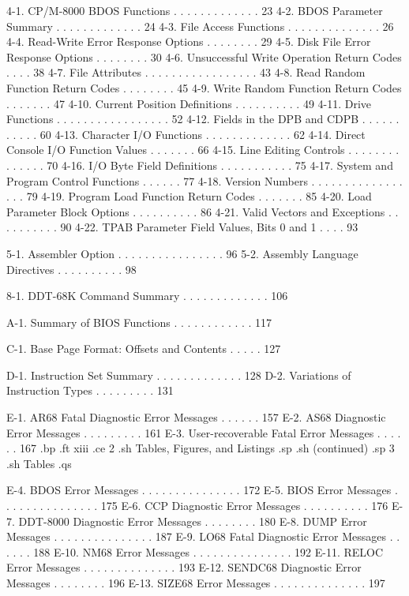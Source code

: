      4-1.  CP/M-8000 BDOS Functions . . . . . . . . . . . . .   23
     4-2.  BDOS Parameter Summary  . . . . . . . . . . . . .   24
     4-3.  File Access Functions . . . . . . . . . . . . . .   26
     4-4.  Read-Write Error Response Options . . . . . . . .   29
     4-5.  Disk File Error Response Options  . . . . . . . .   30
     4-6.  Unsuccessful Write Operation Return Codes . . . .   38
     4-7.  File Attributes . . . . . . . . . . . . . . . . .   43
     4-8.  Read Random Function Return Codes . . . . . . . .   45
     4-9.  Write Random Function Return Codes  . . . . . . .   47
     4-10. Current Position Definitions  . . . . . . . . . .   49
     4-11. Drive Functions . . . . . . . . . . . . . . . . .   52
     4-12. Fields in the DPB and CDPB  . . . . . . . . . . .   60
     4-13. Character I/O Functions . . . . . . . . . . . . .   62
     4-14. Direct Console I/O Function Values  . . . . . . .   66
     4-15. Line Editing Controls . . . . . . . . . . . . . .   70
     4-16. I/O Byte Field Definitions  . . . . . . . . . . .   75
     4-17. System and Program Control Functions  . . . . . .   77
     4-18. Version Numbers . . . . . . . . . . . . . . . . .   79
     4-19. Program Load Function Return Codes  . . . . . . .   85
     4-20. Load Parameter Block Options  . . . . . . . . . .   86
     4-21. Valid Vectors and Exceptions  . . . . . . . . . .   90
     4-22. TPAB Parameter Field Values, Bits 0 and 1 . . . .   93

     5-1.  Assembler Option  . . . . . . . . . . . . . . . .   96
     5-2.  Assembly Language Directives  . . . . . . . . . .   98
          
     8-1.  DDT-68K Command Summary . . . . . . . . . . . . .  106

     A-1.  Summary of BIOS Functions . . . . . . . . . . . .  117
   
     C-1.  Base Page Format:  Offsets and Contents . . . . .  127

     D-1.  Instruction Set Summary . . . . . . . . . . . . .  128
     D-2.  Variations of Instruction Types . . . . . . . . .  131

     E-1.  AR68 Fatal Diagnostic Error Messages  . . . . . .  157
     E-2.  AS68 Diagnostic Error Messages  . . . . . . . . .  161
     E-3.  User-recoverable Fatal Error Messages . . . . . .  167
.bp
.ft                                xiii
.ce 2
.sh
Tables, Figures, and Listings
.sp
.sh
(continued)
.sp 3
.sh
Tables
.qs

     E-4.  BDOS Error Messages . . . . . . . . . . . . . . .  172
     E-5.  BIOS Error Messages . . . . . . . . . . . . . . .  175
     E-6.  CCP Diagnostic Error Messages . . . . . . . . . .  176
     E-7.  DDT-8000 Diagnostic Error Messages . . . . . . . .  180
     E-8.  DUMP Error Messages . . . . . . . . . . . . . . .  187
     E-9.  LO68 Fatal Diagnostic Error Messages  . . . . . .  188
     E-10. NM68 Error Messages . . . . . . . . . . . . . . .  192
     E-11. RELOC Error Messages  . . . . . . . . . . . . . .  193
     E-12. SENDC68 Diagnostic Error Messages . . . . . . . .  196
     E-13. SIZE68 Error Messages . . . . . . . . . . . . . .  197
 
